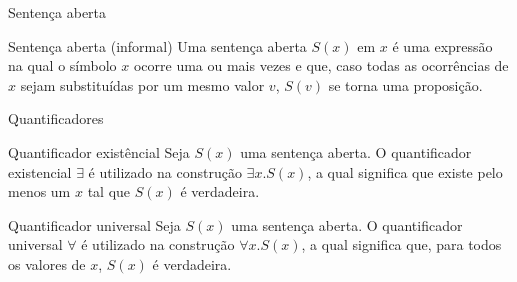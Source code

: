 \begin{frame}[fragile]{Sentença aberta}

    \begin{block}{Sentença aberta (informal)}
        Uma sentença aberta $S(x)$ em $x$ é uma expressão na qual o símbolo $x$ ocorre uma 
        ou mais vezes e que, caso todas as ocorrências de $x$ sejam substituídas por um 
        mesmo valor $v$, $S(v)$ se torna uma proposição.
    \end{block}

\end{frame}

\begin{frame}[fragile]{Quantificadores}

    \begin{block}{Quantificador existêncial}
        Seja $S(x)$ uma sentença aberta. O quantificador existencial $\exists$ é utilizado na construção $\exists x.S(x)$, a qual
        significa que existe pelo menos um $x$ tal que $S(x)$ é verdadeira.
    \end{block}

    \vspace{0.3in}

    \begin{block}{Quantificador universal}
        Seja $S(x)$ uma sentença aberta. O quantificador universal $\forall$ é utilizado na construção $\forall x.S(x)$, a qual
        significa que, para todos os valores de $x$, $S(x)$ é verdadeira.
    \end{block}
\end{frame}
